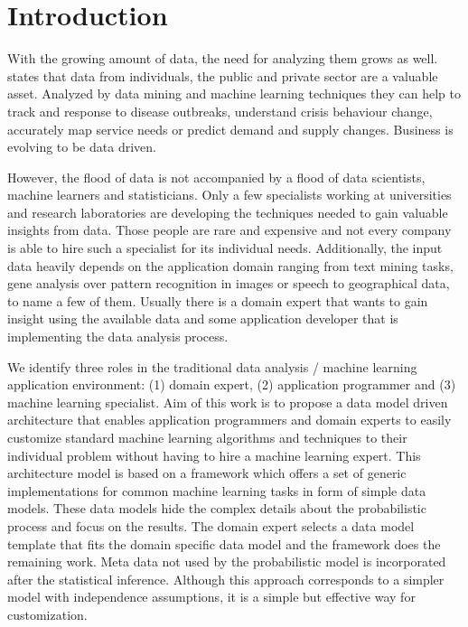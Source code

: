 \section{Introduction}

With the growing amount of data, the need for analyzing them grows as well. \textcite{forum2012bigdata} states that data from individuals, the public and private sector are a valuable asset. Analyzed by data mining and machine learning techniques they can help to track and response to disease outbreaks, understand crisis behaviour change, accurately map service needs or predict demand and supply changes. Business is evolving to be data driven.

However, the flood of data is not accompanied by a flood of data scientists, machine learners and statisticians. Only a few specialists working at universities and research laboratories are developing the techniques needed to gain valuable insights from data. Those people are rare and expensive and not every company is able to hire such a specialist for its individual needs. Additionally, the input data heavily depends on the application domain ranging from text mining tasks, gene analysis over pattern recognition in images or speech to geographical data, to name a few of them. Usually there is a domain expert that wants to gain insight using the available data and some application developer that is implementing the data analysis process.

We identify three roles in the traditional data analysis / machine learning application environment: (1) domain expert, (2) application programmer and (3) machine learning specialist. Aim of this work is to propose a data model driven architecture that enables application programmers and domain experts to easily customize standard machine learning algorithms and techniques to their individual problem without having to hire a machine learning expert. This architecture model is based on a framework which offers a set of generic implementations for common machine learning tasks in form of simple data models. These data models hide the complex details about the probabilistic process and focus on the results. The domain expert selects a data model template that fits the domain specific data model and the framework does the remaining work. Meta data not used by the probabilistic model is incorporated after the statistical inference. Although this approach corresponds to a simpler model with independence assumptions, it is a simple but effective way for customization.

